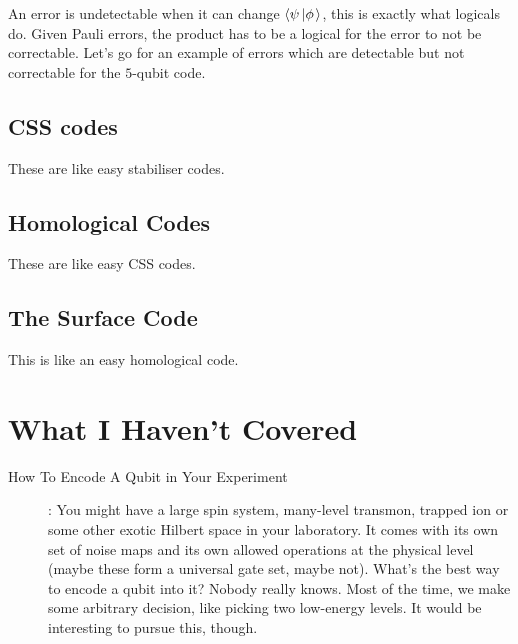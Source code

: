 \documentclass[10pt,a4paper, english]{scrartcl}
\begin{document}
An error is undetectable when it can change $\left \langle \psi \left \vert \phi \right. \right \rangle$, this is exactly what logicals do. 
Given Pauli errors, the product has to be a logical for the error to not be correctable. 
Let's go for an example of errors which are detectable but not correctable for the $5$-qubit code.
\subsection{CSS codes}
These are like easy stabiliser codes.
\subsection{Homological Codes}
These are like easy CSS codes.
\subsection{The Surface Code}
This is like an easy homological code.
\section{What I Haven't Covered}
\begin{description}
\item[How To Encode A Qubit in Your Experiment]: You might have a large spin system, many-level transmon, trapped ion or some other exotic Hilbert space in your laboratory.
It comes with its own set of noise maps and its own allowed operations at the physical level (maybe these form a universal gate set, maybe not).
What's the best way to encode a qubit into it?
Nobody really knows. 
Most of the time, we make some arbitrary decision, like picking two low-energy levels. 
It would be interesting to pursue this, though. 
\end{description}
\end{document}

